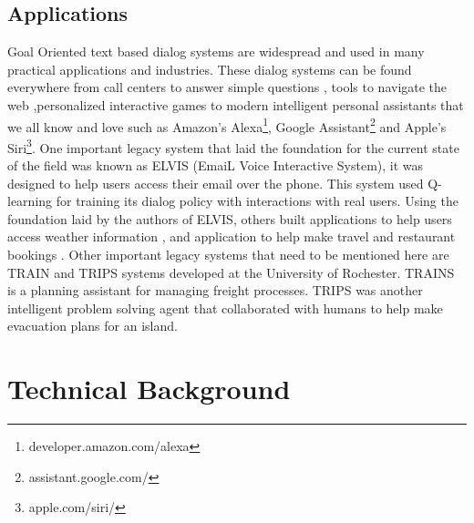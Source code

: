 \documentclass[14pt]{extarticle}
\numberwithin{equation}{section}
\begin{document}
	\subsection{Applications}
	Goal Oriented text based dialog systems are widespread and used in many practical applications and industries. These dialog systems can be found everywhere from call centers to answer simple questions \cite{georgila1998integrated}, tools to navigate the web \cite{chai2001natural} ,personalized interactive games\cite{su2013dialoguegame} to modern intelligent personal assistants that we all know and love such as Amazon's Alexa\footnote{developer.amazon.com/alexa}, Google Assistant\footnote{assistant.google.com/} and Apple's Siri\footnote{apple.com/siri/}. One important legacy system that laid the foundation for the current state of the field was known as ELVIS (EmaiL Voice Interactive System), it was designed to help users access their email over the phone\cite{ELVIS}. This system used Q-learning for training its dialog policy with interactions with real users. Using the foundation laid by the authors of ELVIS, others built applications to help users access weather information \cite{zue_jupiter}, and application to help make travel and restaurant bookings \cite{Shriver_unified}. Other important legacy systems that need to be mentioned here are TRAIN\cite{TRAIN} and TRIPS\cite{ferguson1998trips} systems developed at the University of Rochester. TRAINS is a planning assistant for managing freight processes. TRIPS was another intelligent problem solving agent that collaborated with humans to help make evacuation plans for an island.
	\pagebreak
	\section{Technical Background}
\end{document}
